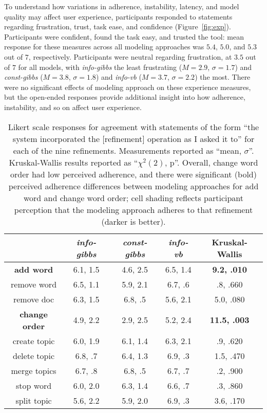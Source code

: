 To understand how variations in adherence, instability, latency, and model quality may affect user
experience, participants responded to statements regarding
frustration, trust, task ease, and confidence
(Figure~\ref{fig:exp}). Participants were 
confident, found the task easy, and trusted the tool:
mean response for these measures across all modeling approaches was $5.4$, $5.0$, and $5.3$ out of $7$,
respectively. Participants were neutral regarding frustration, at $3.5$ out of $7$ for all models, with
\textit{info-gibbs} the least frustrating
($M=2.9$, $\sigma=1.7$) and \textit{const-gibbs} ($M=3.8$, $\sigma=1.8$) and \textit{info-vb} ($M=3.7$, $\sigma=2.2$)
the most. There were no significant effects of modeling approach on these experience measures, but the open-ended responses provide additional insight into how adherence, instability, and so on affect user experience.


\begin{table}
  \caption{Likert scale responses for agreement with statements of the form ``the system incorporated the [refinement] operation as I asked it to'' for each of the nine refinements. Measurements reported as ``mean,
    $\sigma$''. Kruskal-Wallis
    results reported as
    ``${\chi}^2(2)$, p''. Overall, change word order had low perceived adherence, and there were significant (bold) perceived adherence differences between modeling approaches
    for add word and change word order; cell shading reflects participant perception that the modeling approach adheres to that refinement (darker is better).}
  \label{tab:ref_control}
    \begin{center}
    \small
      \begin{tabular}{c c c c c}
        \hline
        & \textit{info-gibbs} & \textit{const-gibbs} & \textit{info-vb} & Kruskal-Wallis \\
        \hline \hline
        \textbf{add word} & \cellcolor[gray]{0.7}6.1, 1.5 & \cellcolor[gray]{0.9}4.6, 2.5 & \cellcolor[gray]{0.7}6.5, 1.4 & \textbf{9.2, .010} \\
        remove word & 6.5, 1.1 & 5.9, 2.1 & 6.7, .6 & .8, .660 \\
        remove doc & 6.3, 1.5 & 6.8, .5 & 5.6, 2.1 & 5.0, .080 \\
        \textbf{change order} & \cellcolor[gray]{0.8}4.9, 2.2 & \cellcolor[gray]{0.9}2.9, 2.5 & \cellcolor[gray]{0.8}5.2, 2.4 & \textbf{11.5, .003} \\
        create topic & 6.0, 1.9 & 6.1, 1.4 & 6.3, 2.1 & .9, .620 \\
        delete topic & 6.8, .7 & 6.4, 1.3 & 6.9, .3 & 1.5, .470\\
        merge topics  & 6.7, .8 & 6.8, .5 & 6.7, .7 & .2, .900\\
        stop word  & 6.0, 2.0 & 6.3, 1.4 & 6.6, .7 & .3, .860 \\
        split topic & 5.6, 2.2 & 5.9, 2.0 & 6.9, .3 & 3.6, .170 \\
        \hline
      \end{tabular}
    \end{center}
    \bigskip\centering
\end{table}




